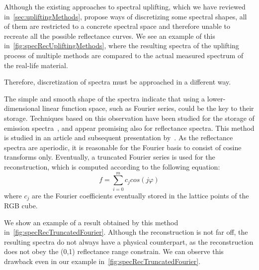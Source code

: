 Although the existing approaches to spectral uplifting, which we have reviewed in~\cref{sec:upliftingMethods}, propose ways of discretizing some spectral shapes, all of them are restricted to a concrete spectral space and therefore unable to recreate all the possible reflectance curves. We see an example of this in~\cref{fig:specRecUpliftingMethods}, where the resulting spectra of the uplifting process of multiple methods are compared to the actual measured spectrum of the real-life material.

Therefore, discretization of spectra must be approached in a different way.

The simple and smooth shape of the spectra indicate that using a lower-dimensional linear function space, such as Fourier series, could be the key to their storage. Techniques based on this observation have been studied for the storage of emission spectra~\cite{fourierRepresEmission}, and appear promising also for reflectance spectra. This method is studied in an article and subsequent presentation by~\citet{trigonometricMomentsPresentation}. As the reflectance spectra are aperiodic, it is reasonable for the Fourier basis to consist of cosine transforms only. Eventually, a truncated Fourier series is used for the reconstruction, which is computed according to the following equation:
\begin{equation} \label{truncatedFourierSeries}
  f = \sum_{i=0}^{m}c_j cos(j\varphi)
\end{equation}
where $c_j$ are the Fourier coefficients eventually stored in the lattice points of the RGB cube.

We show an example of a result obtained by this method in~\cref{fig:specRecTruncatedFourier}. Although the reconstruction is not far off, the resulting spectra do not always have a physical counterpart, as the reconstruction does not obey the (0,1) reflectance range constrain. We can observe this drawback even in our example in~\cref{fig:specRecTruncatedFourier}.

